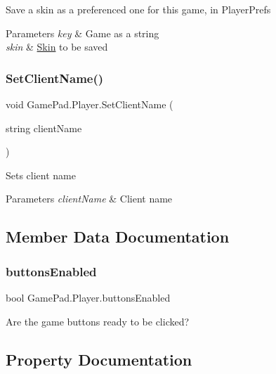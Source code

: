 Save a skin as a preferenced one for this game, in Player\+Prefs 


\begin{DoxyParams}{Parameters}
{\em key} & Game as a string\\
\hline
{\em skin} & \mbox{\hyperlink{class_skin}{Skin}} to be saved\\
\hline
\end{DoxyParams}
\mbox{\label{class_game_pad_1_1_player_a40520d0dcb776c329eaa27df71530c7e}} 
\subsubsection{\texorpdfstring{SetClientName()}{SetClientName()}}
{\footnotesize\ttfamily void Game\+Pad.\+Player.\+Set\+Client\+Name (\begin{DoxyParamCaption}\item[{string}]{client\+Name }\end{DoxyParamCaption})}



Sets client name 


\begin{DoxyParams}{Parameters}
{\em client\+Name} & Client name\\
\hline
\end{DoxyParams}


\subsection{Member Data Documentation}
\mbox{\label{class_game_pad_1_1_player_ac313e382120a9a078b14699582519e21}} 
\subsubsection{\texorpdfstring{buttonsEnabled}{buttonsEnabled}}
{\footnotesize\ttfamily bool Game\+Pad.\+Player.\+buttons\+Enabled}



Are the game buttons ready to be clicked? 



\subsection{Property Documentation}
\mbox{\label{class_game_pad_1_1_player_ac192b98678d2dee17a969ee788d7a1a3}} 
